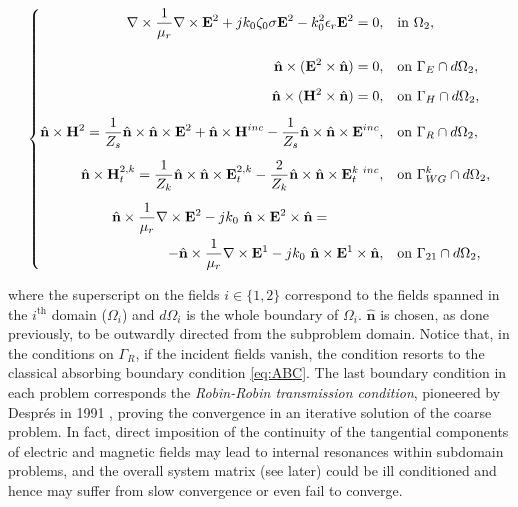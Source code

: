\begin{equation}
\label{eq:FETID2}
\left\lbrace
\begin{aligned}
\nabla \times \frac{1}{\mu_r} \nabla \times {\mathbf{E}^2} + j k_0 \zeta_0 \sigma {\mathbf{E}^2} - k_0^2 \epsilon_r {\mathbf{E}^2} = 0,& \quad \mathrm{in} \ \Omega_2,\\[10pt]
\hat{\mathbf{n}} \times ( {\mathbf{E}^2} \times \hat{\mathbf{n}}) = 0,& \quad \mathrm{on} \ \mathrm{\Gamma}_E \cap d\Omega_2, \\[5pt]
\hat{\mathbf{n}} \times ( {\mathbf{H}^2} \times \hat{\mathbf{n}}) = 0,& \quad  \mathrm{on} \ \mathrm{\Gamma}_{H} \cap d\Omega_2, \\[5pt]
\hat{\mathbf{n}} \times \mathbf{H}^2 = \frac{1}{Z_s} \hat{\mathbf{n}} \times \hat{\mathbf{n}} \times \mathbf{E}^2 + \hat{\mathbf{n}} \times \mathbf{H}^{inc} - \frac{1}{Z_s} \hat{\mathbf{n}} \times \hat{\mathbf{n}} \times \mathbf{E}^{inc},& \quad \mathrm{on} \ \Gamma_{R} \cap d\Omega_2, \\[5pt]
\hat{\mathbf{n}} \times \mathbf{H}_t^{2,k} = \frac{1}{Z_k} \hat{\mathbf{n}} \times \hat{\mathbf{n}} \times \mathbf{E}_t^{2,k} - \frac{2}{Z_k} \hat{\mathbf{n}} \times \hat{\mathbf{n}} \times \mathbf{E}_t^{k \ inc},& \quad \mathrm{on} \ \Gamma_{WG}^k \cap d\Omega_2,\\[5pt]
\hspace{-1cm}\hat{\mathbf{n}} \times \frac{1}{\mu_r} \nabla \times \mathbf{E}^2 - jk_0 \ \hat{\mathbf{n}} \times \mathbf{E}^2 \times \hat{\mathbf{n}} = \qquad \qquad &\\ - \hat{\mathbf{n}} \times \frac{1}{\mu_r} \nabla \times \mathbf{E}^1 - jk_0 \ \hat{\mathbf{n}} \times \mathbf{E}^1 \times \hat{\mathbf{n}},& \quad \mathrm{on} \ \Gamma_{21} \cap d\Omega_2,
\end{aligned}
\right.
\end{equation}

\noindent where the superscript on the fields $i \in \lbrace 1,2 \rbrace$ correspond to the fields spanned in the $i^\mathrm{th}$ domain ($\Omega_i$) and $d\Omega_i$ is the whole boundary of $\Omega_i$. $\hat{\mathbf{n}}$ is chosen, as done previously, to be outwardly directed from the subproblem domain. Notice that, in the conditions on $\Gamma_R$, if the incident fields vanish, the condition resorts to the classical absorbing boundary condition \eqref{eq:ABC}. The last boundary condition in each problem corresponds the \textit{Robin-Robin transmission condition}, pioneered by Despr\'es in 1991 \cite{Despres1991,Despres1992}, proving the convergence in an iterative solution of the coarse problem. In fact, direct imposition of the continuity of the tangential components of electric and magnetic fields may lead to internal resonances within subdomain problems, and the overall system matrix (see later) could be ill conditioned and hence may suffer from slow convergence or even fail to converge.

